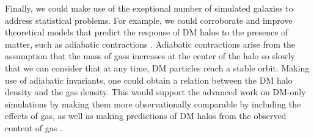 Finally, we could make use of the exeptional number of simulated galaxies to address statistical problems. For example, we could corroborate and improve theoretical models that predict the response of DM halos to the presence of matter, such as adiabatic contractions \cite{}. Adiabatic contractions arise from the assumption that the mass of gass increases at the center of the halo so slowly that we can consider that at any time, DM particles reach a stable orbit. Making use of adiabatic invariants, one could obtain a relation between the DM halo density and the gas density. This would support the advanced work on DM-only simulations by making them more observationally comparable by including the effects of gas, as well as making predictions of DM halos from the observed content of gas \cite{}.\\




 
 
